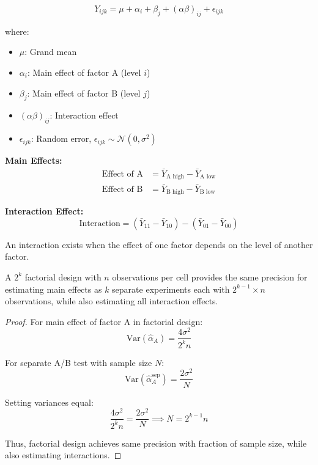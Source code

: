 \begin{equation}
Y_{ijk} = \mu + \alpha_i + \beta_j + (\alpha\beta)_{ij} + \epsilon_{ijk}
\end{equation}

where:
\begin{itemize}
    \item $\mu$: Grand mean
    \item $\alpha_i$: Main effect of factor A (level $i$)
    \item $\beta_j$: Main effect of factor B (level $j$)
    \item $(\alpha\beta)_{ij}$: Interaction effect
    \item $\epsilon_{ijk}$: Random error, $\epsilon_{ijk} \sim \mathcal{N}(0, \sigma^2)$
\end{itemize}

\textbf{Main Effects:}
\begin{align}
\text{Effect of A} &= \bar{Y}_{\text{A high}} - \bar{Y}_{\text{A low}} \\
\text{Effect of B} &= \bar{Y}_{\text{B high}} - \bar{Y}_{\text{B low}}
\end{align}

\textbf{Interaction Effect:}
\begin{equation}
\text{Interaction} = (\bar{Y}_{11} - \bar{Y}_{10}) - (\bar{Y}_{01} - \bar{Y}_{00})
\end{equation}

An interaction exists when the effect of one factor depends on the level of another factor.

\begin{theorem}
A $2^k$ factorial design with $n$ observations per cell provides the same precision for estimating main effects as $k$ separate experiments each with $2^{k-1} \times n$ observations, while also estimating all interaction effects.
\end{theorem}

\begin{proof}
For main effect of factor A in factorial design:
\begin{equation}
\text{Var}(\hat{\alpha}_A) = \frac{4\sigma^2}{2^k n}
\end{equation}

For separate A/B test with sample size $N$:
\begin{equation}
\text{Var}(\hat{\alpha}_A^{\text{sep}}) = \frac{2\sigma^2}{N}
\end{equation}

Setting variances equal:
\begin{equation}
\frac{4\sigma^2}{2^k n} = \frac{2\sigma^2}{N} \implies N = 2^{k-1} n
\end{equation}

Thus, factorial design achieves same precision with fraction of sample size, while also estimating interactions.
\end{proof}

